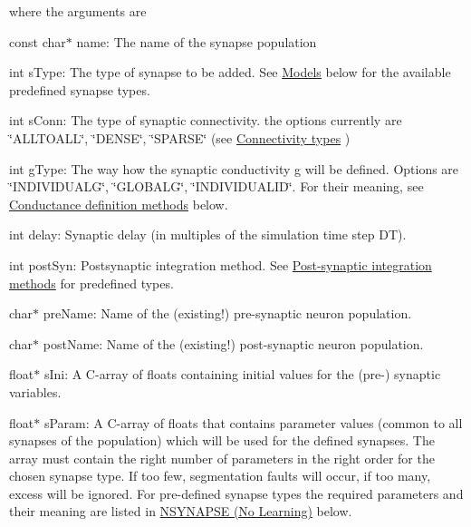  where the arguments are \begin{DoxyItemize}
\item {\ttfamily const} {\ttfamily char$\ast$} name\+: The name of the synapse population \item {\ttfamily int} {\ttfamily s\+Type\+:} The type of synapse to be added. See \hyperlink{sect3_subsect31}{Models} below for the available predefined synapse types. \item {\ttfamily int} {\ttfamily s\+Conn\+:} The type of synaptic connectivity. the options currently are \char`\"{}\+A\+L\+L\+T\+O\+A\+L\+L\char`\"{}, \char`\"{}\+D\+E\+N\+S\+E\char`\"{}, \char`\"{}\+S\+P\+A\+R\+S\+E\char`\"{} (see \hyperlink{sect3_subsect32}{Connectivity types} ) \item {\ttfamily int} {\ttfamily g\+Type\+:} The way how the synaptic conductivity g will be defined. Options are \char`\"{}\+I\+N\+D\+I\+V\+I\+D\+U\+A\+L\+G\char`\"{}, \char`\"{}\+G\+L\+O\+B\+A\+L\+G\char`\"{}, \char`\"{}\+I\+N\+D\+I\+V\+I\+D\+U\+A\+L\+I\+D\char`\"{}. For their meaning, see \hyperlink{sect3_subsect33}{Conductance definition methods} below. \item {\ttfamily int} {\ttfamily delay\+:} Synaptic delay (in multiples of the simulation time step {\ttfamily D\+T}). \item {\ttfamily int} {\ttfamily post\+Syn\+:} Postsynaptic integration method. See \hyperlink{sect_postsyn}{Post-\/synaptic integration methods} for predefined types. \item {\ttfamily char$\ast$} {\ttfamily pre\+Name\+:} Name of the (existing!) pre-\/synaptic neuron population. \item {\ttfamily char$\ast$} {\ttfamily post\+Name\+:} Name of the (existing!) post-\/synaptic neuron population. \item {\ttfamily float$\ast$} {\ttfamily s\+Ini\+:} A C-\/array of floats containing initial values for the (pre-\/) synaptic variables. \item {\ttfamily float$\ast$} {\ttfamily s\+Param\+:} A C-\/array of floats that contains parameter values (common to all synapses of the population) which will be used for the defined synapses. The array must contain the right number of parameters in the right order for the chosen synapse type. If too few, segmentation faults will occur, if too many, excess will be ignored. For pre-\/defined synapse types the required parameters and their meaning are listed in \hyperlink{sect3_sect31}{N\+S\+Y\+N\+A\+P\+S\+E (No Learning)} below.\end{DoxyItemize}
